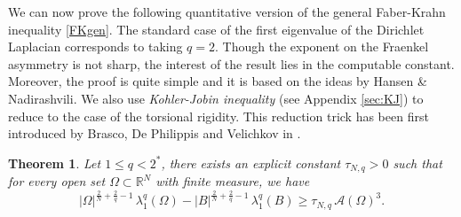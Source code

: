 \documentclass{amsart}
\newtheorem{theorem}[lemma]{Theorem}
\theoremstyle{definition}
\numberwithin{equation}{section}
\begin{document}
We can now prove the following quantitative version of the general Faber-Krahn inequality \eqref{FKgen}. The standard case of the first eigenvalue of the Dirichlet Laplacian corresponds to taking $q=2$.
Though the exponent on the Fraenkel asymmetry is not sharp, the interest of the result lies in the computable constant. 
Moreover, the proof is quite simple and it is based on the ideas by Hansen \& Nadirashvili. We also use {\it Kohler-Jobin inequality} (see Appendix \ref{sec:KJ}) to reduce to the case of the torsional rigidity. This reduction trick has been first introduced by Brasco, De Philippis and Velichkov in \cite{MR3357184}.
\begin{theorem}
\label{teo:HN}
Let $1\le q<2^*$, there exists an explicit constant $\tau_{N,q}>0$ such that for every open set $\Omega\subset\mathbb{R}^N$ with finite measure, we have
\begin{equation}
\label{HN2}
|\Omega|^{\frac{2}{N}+\frac{2}{q}-1}\, \lambda_1^q(\Omega)- |B|^{\frac{2}{N}+\frac{2}{q}-1}\, \lambda_1^q(B)\ge \tau_{N,q}\, \mathcal{A}(\Omega)^3.
\end{equation}
\end{theorem}
\end{document}

